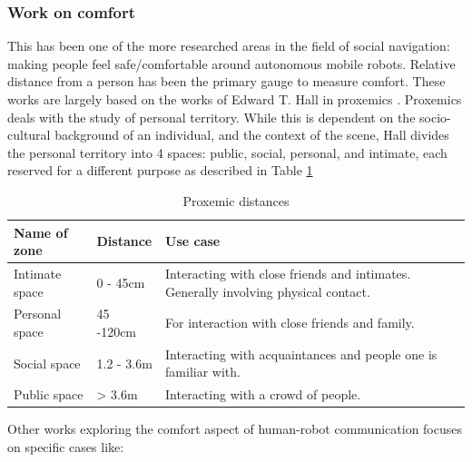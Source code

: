 \subsubsection{Work on comfort}
This has been one of the more researched areas in the field of social navigation: making people feel safe/comfortable around autonomous mobile robots. Relative distance from a person has been the primary gauge to measure comfort. These works are largely based on the works of Edward T. Hall in proxemics \cite{proxemics_hall_1968}. Proxemics deals with the study of personal territory. While this is dependent on the socio-cultural background of an individual, and the context of the scene, Hall divides the personal territory into 4 spaces: public, social, personal, and intimate, each reserved for a different purpose as described in Table \ref{tab:proxemics}
\begin{table}
    \label{tab:proxemics}
    \caption{Proxemic distances}
    \begin{center}
        \renewcommand{\arraystretch}{1.3}
        \begin{tabular}{|p{}|p{}|p{}|}
            \hline
            Name of zone & Distance & Use case \\
            \hline\hline
            Intimate space & 0 - 45cm &  Interacting with close friends and intimates. Generally involving physical contact.\\
            Personal space & 45 -120cm &  For interaction with close friends and family. \\
            Social space & 1.2 - 3.6m &  Interacting with acquaintances and people one is familiar with.\\
            Public space & > 3.6m &  Interacting with a crowd of people.\\
            \hline
        \end{tabular}
    \end{center}
\end{table}
Other works exploring the comfort aspect of human-robot communication focuses on specific cases like:
